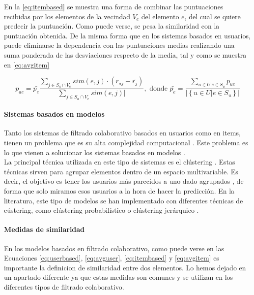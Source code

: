 En la \autoref{eq:itembased} se muestra una forma de combinar las puntuaciones recibidas por los elementos de la vecindad $V_e$ del elemento $e$, del cual se quiere predecir la puntuación. Como puede verse, se pesa la similaridad con la puntuación obtenida. De la misma forma que en los sistemas basados en usuarios, puede eliminarse la dependencia con las puntuaciones medias realizando una suma ponderada de las desviaciones respecto de la media, tal y como se muestra en \autoref{eq:avgitem}

\begin{equation}
    p_{ae} = \bar{p_e} \frac{\sum_{j \in S_a \cap V_e}{sim\left(e, j\right) \cdot \left(r_{aj}-\bar{r_j}\right)}}{\sum_{j \in S_a \cap V_e}{sim\left(e, j\right)|}},\text{ donde } \bar{p_e} = \frac{\sum_{u \in U | e \in S_u}{p_{ue}}}{|\left\{u \in U | e \in S_u\right\}|}
    \label{eq:avgitem}
\end{equation}

\paragraph{Sistemas basados en modelos}

Tanto los sistemas de filtrado colaborativo basados en usuarios como en items, tienen un problema que es su alta complejidad computacional \cite{Candiller}. Este problema es lo que vienen a solucionar los sistemas basados en modelos \cite{breese}.\\

La principal técnica utilizada en este tipo de sistemas es el clústering \cite{macqueen}. Estas técnicas sirven para agrupar elementos dentro de un espacio multivariable. Es decir, el objetivo es tener los usuarios más parecidos a uno dado agrupados \cite{oconnor}, de forma que solo miramos esos usuarios a la hora de hacer la predicción. En la literatura, este tipo de modelos se han implementado con diferentes técnicas de cústering, como clústering probabilístico \cite{pennock} o clústering jerárquico \cite{kelleher}.

\paragraph{Medidas de similaridad}

En los modelos basados en filtrado colaborativo, como puede verse en las Ecuaciones \ref{eq:userbased}, \ref{eq:avguser}, \ref{eq:itembased} y \ref{eq:avgitem} es importante la definicion de similaridad entre dos elementos. Lo hemos dejado en un apartado diferente ya que estas medidas son comunes y se utilizan en los diferentes tipos de filtrado colaborativo.\\

